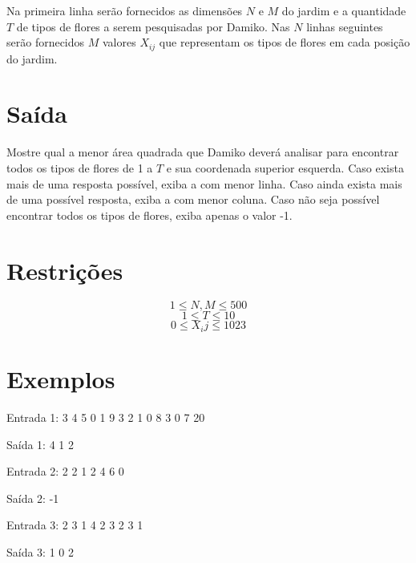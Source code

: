 \documentclass{article}
\begin{document}
Na primeira linha serão fornecidos as dimensões $N$ e $M$ do jardim e a quantidade $T$ de tipos de flores a serem pesquisadas por Damiko. Nas $N$ linhas seguintes serão fornecidos $M$ valores $X_{ij}$ que representam os tipos de flores em cada posição do jardim.

\section*{Saída}

Mostre qual a menor área quadrada que Damiko deverá analisar para encontrar todos os tipos de flores de 1 a $T$ e sua coordenada superior esquerda. Caso exista mais de uma resposta possível, exiba a com menor linha. Caso ainda exista mais de uma possível resposta, exiba a com menor coluna. Caso não seja possível encontrar todos os tipos de flores, exiba apenas o valor -1.

\section*{Restrições}

$$1 \leq N,M \leq 500$$
$$1 \leq T \leq 10$$
$$0 \leq X_ij \leq 1023$$

\section*{Exemplos}
Entrada 1:
3 4 5
0 1 9 3
2 1 0 8
3 0 7 20

Saída 1:
4
1 2

Entrada 2:
2 2 1
2 4
6 0

Saída 2:
-1

Entrada 3:
2 3 1
4 2 3
2 3 1

Saída 3:
1
0 2

\exemplo
\end{document}
